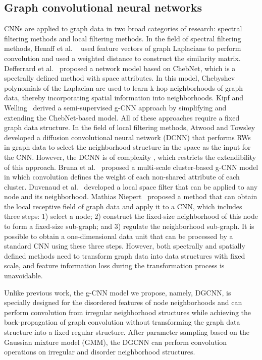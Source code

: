 \documentclass[11pt]{article}
\begin{document}
\subsection{Graph convolutional neural networks}
CNNs are applied to graph data in two broad categories of research: spectral filtering methods and local filtering methods. In the field of spectral filtering methods, Henaff et al. ~\cite{HenaffBL15} used feature vectors of graph Laplacians to perform convolution and used a weighted distance to construct the similarity matrix. Defferrard et al.~\cite{Defferrard2016Convolutional_12} proposed a network model based on ChebNet, which is a spectrally defined method with space attributes. In this model, Chebyshev polynomials of the Laplacian are used to learn k-hop neighborhoods of graph data, thereby incorporating spatial information into neighborhoods. Kipf and Welling~\cite{Kipf2016Semi_14} derived a semi-supervised g-CNN approach by simplifying and extending the ChebNet-based model. All of these approaches require a fixed graph data structure. In the field of local filtering methods, Atwood and Towsley developed a diffusion convolutional neural network (DCNN) that performs RWs in graph data to select the neighborhood structure in the space as the input for the CNN. However, the DCNN is of complexity , which restricts the extendibility of this approach. Bruna et al.~\cite{Bruna2013Spectral_5} proposed a multi-scale cluster-based g-CNN model in which convolution defines the weight of each non-shared attribute of each cluster. Duvenaud et al.~\cite{Defferrard2016Convolutional_12} developed a local space filter that can be applied to any node and its neighborhood. Mathias Niepert~\cite{Niepert2016Learning_10} proposed a method that can obtain the local receptive field of graph data and apply it to a CNN, which includes three steps: 1) select a node; 2) construct the fixed-size neighborhood of this node to form a fixed-size sub-graph; and 3) regulate the neighborhood sub-graph. It is possible to obtain a one-dimensional data unit that can be processed by a standard CNN using these three steps. However, both spectrally and spatially defined methods need to transform graph data into data structures with fixed scale, and feature information loss during the transformation process is unavoidable.

Unlike previous work, the g-CNN model we propose, namely, DGCNN, is specially designed for the disordered features of node neighborhoods and can perform convolution from irregular neighborhood structures while achieving the back-propagation of graph convolution without transforming the graph data structure into a fixed regular structure. After parameter sampling based on the Gaussian mixture model (GMM), the DGCNN can perform convolution operations on irregular and disorder neighborhood structures.
\end{document}
